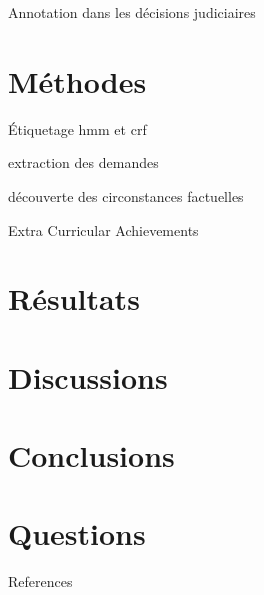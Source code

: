 \documentclass[newPxFont,pagenumber]{beamer}
\begin{document}
\begin{frame}[c]{Annotation dans les décisions judiciaires}
	
\end{frame}


\section{Méthodes}
\begin{frame}[c]{Étiquetage hmm et crf}
	
\end{frame}


\begin{frame}[c]{extraction des demandes}
	
\end{frame}

\begin{frame}[c]{découverte des circonstances factuelles}
	\noindent\colorbox{shadecolor}
	{\parbox{\dimexpr\textwidth-2\fboxsep\relax}{Extra Curricular Achievements}}
\end{frame}

\section{Résultats}

\section{Discussions}

\section{Conclusions}

\section{Questions}




\begin{frame}[t,allowframebreaks]{References}
\tiny

	
\end{frame}
\end{document}
